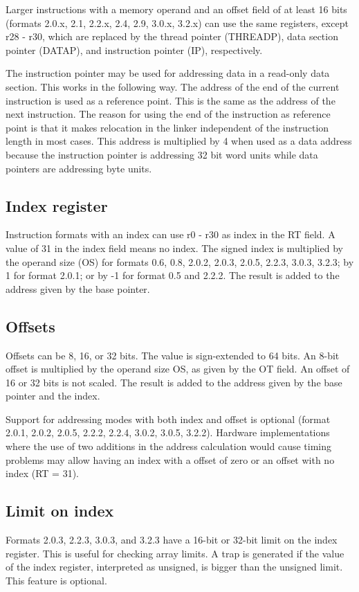 \documentclass[forwardcom.tex]{subfiles}
\begin{document}
Larger instructions with a memory operand and an offset field of at least 16 bits (formats 2.0.x, 2.1, 2.2.x, 2.4, 2.9, 3.0.x, 3.2.x) can use the same registers, except r28 - r30,  which are replaced by the thread pointer (THREADP), data section pointer (DATAP), and instruction pointer (IP), respectively.
\vv

The instruction pointer may be used for addressing data in a read-only data section. This works in the following way. The address of the end of the current instruction is used as a reference point. This is the same as the address of the next instruction. The reason for using the end of the instruction as reference point is that it makes relocation in the linker independent of the instruction length in most cases. This address is multiplied by 4 when used as a data address because the instruction pointer is addressing 32 bit word units while data pointers are addressing byte units.
\vv


\subsection{Index register}
Instruction formats with an index can use r0 - r30 as index in the RT field. 
A value of 31 in the index field means no index. The signed index is multiplied by the operand size (OS) for formats 0.6, 0.8, 2.0.2, 2.0.3, 2.0.5, 2.2.3, 3.0.3, 3.2.3; by 1 for format 2.0.1; or by -1 for format 0.5 and 2.2.2. The result is added to the address given by the base pointer.

\subsection{Offsets}
Offsets can be 8, 16, or 32 bits. The value is sign-extended to 64 bits. An 8-bit offset is multiplied by the operand size OS, as given by the OT field. An offset of 16 or 32 bits is not scaled. The result is added to the address given by the base pointer and the index.
\vv

Support for addressing modes with both index and offset is optional 
(format 2.0.1, 2.0.2, 2.0.5, 2.2.2, 2.2.4, 3.0.2, 3.0.5, 3.2.2). 
Hardware implementations where the use of two additions in the address calculation would cause timing problems may allow having an index with a offset of zero or an offset with no index (RT = 31).
\vv

\subsection{Limit on index}
Formats 2.0.3, 2.2.3, 3.0.3, and 3.2.3 have a 16-bit or 32-bit limit on the index register. This is useful for checking array limits. A trap is generated if the value of the index register, interpreted as unsigned, is bigger than the unsigned limit. This feature is optional.
\end{document}
